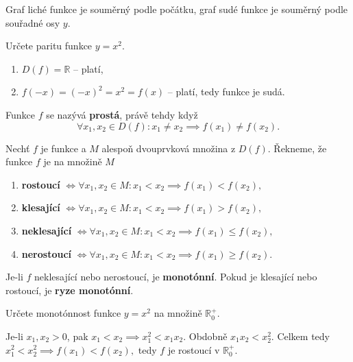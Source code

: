 \begin{pozn}
  Graf liché funkce je souměrný podle počátku, graf sudé funkce je souměrný podle souřadné osy $y$.
\end{pozn}

\begin{priklad}
Určete paritu funkce $y=x^2$.
\end{priklad}

\begin{reseni}
\begin{enumerate}[1.]
\item $D(f)=\mathbb R$ -- platí,
\item $f(-x)=(-x)^2=x^2=f(x)$ -- platí, tedy funkce je sudá.
\end{enumerate}
\end{reseni}

\begin{definition}
  Funkce $f$ se nazývá \textbf{prostá}, právě tehdy když
  \[
    \forall x_1,x_2\in D(f): x_1\ne x_2 \implies f(x_1)\ne f(x_2).
  \]
\end{definition}

\begin{definition}
  Nechť $f$ je funkce a $M$ alespoň dvouprvková množina z $D(f)$. Řekneme, že funkce $f$ je na množině $M$
  \begin{enumerate}[$i.$]
    \item \textbf{rostoucí} $\iff \forall x_1, x_2 \in M: x_1 < x_2 \implies f(x_1) < f(x_2),$
    \item \textbf{klesající} $\iff \forall x_1, x_2 \in M: x_1 < x_2 \implies f(x_1) > f(x_2),$
    \item \textbf{neklesající} $\iff \forall x_1, x_2 \in M: x_1 < x_2 \implies f(x_1) \leq f(x_2),$
    \item \textbf{nerostoucí} $\iff \forall x_1, x_2 \in M: x_1 < x_2 \implies f(x_1) \geq f(x_2).$
  \end{enumerate}
  Je-li $f$ neklesající nebo nerostoucí, je \textbf{monotónní}. Pokud je klesající nebo rostoucí, je \textbf{ryze monotónní}.
\end{definition}

\begin{priklad}
Určete monotónnost funkce $y=x^2$ na množině $\mathbb R_0^+.$
\end{priklad}
\begin{reseni}
Je-li $x_1,x_2 >0$, pak $x_1 < x_2 \implies x_1^2 < x_1x_2.$ Obdobně $x_1x_2<x_2^2$.
Celkem tedy $x_1^2<x_2^2 \implies f(x_1)<f(x_2),$ tedy $f$ je rostoucí v $\mathbb R_0^+.$
\end{reseni}

